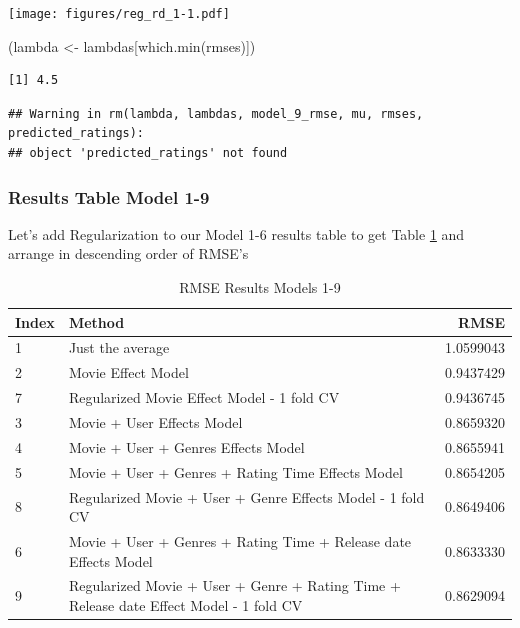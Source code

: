 \documentclass[
]{article}
\newenvironment{Shaded}{}{}
\newcommand{\FunctionTok}[1]{\textcolor[rgb]{0.02,0.16,0.49}{#1}}
\newcommand{\NormalTok}[1]{#1}
\newcommand{\OtherTok}[1]{\textcolor[rgb]{0.00,0.44,0.13}{#1}}
\newcommand{\SpecialCharTok}[1]{\textcolor[rgb]{0.25,0.44,0.63}{#1}}
\begin{document}
\begin{Shaded}
\end{Shaded}

\texttt{[image: figures/reg\_rd\_1-1.pdf]}

\begin{Shaded}
\begin{Highlighting}[]
\NormalTok{(lambda }\OtherTok{\textless{}{-}}\NormalTok{ lambdas[}\FunctionTok{which.min}\NormalTok{(rmses)])}
\end{Highlighting}
\end{Shaded}

\begin{verbatim}
[1] 4.5
\end{verbatim}

\begin{verbatim}
## Warning in rm(lambda, lambdas, model_9_rmse, mu, rmses, predicted_ratings):
## object 'predicted_ratings' not found
\end{verbatim}

\newpage

\hypertarget{results-table-model-1-9}{%
\subsubsection{Results Table Model 1-9}\label{results-table-model-1-9}}

Let's add Regularization to our Model 1-6 results table to get Table
\ref{tbl:rmse_results_model_1-9} and arrange in descending order of
RMSE's

\begin{table}[H]

\caption{\label{tab:reg_rd_3}RMSE Results Models 1-9\label{tbl:rmse_results_model_1-9}}
\centering
\fontsize{7}{9}\selectfont
\begin{tabular}[t]{llr}
\toprule
Index & Method & RMSE\\
\midrule
1 & Just the average & 1.0599043\\
2 & Movie Effect Model & 0.9437429\\
7 & Regularized Movie Effect Model - 1 fold CV & 0.9436745\\
3 & Movie + User Effects Model & 0.8659320\\
4 & Movie + User + Genres Effects Model & 0.8655941\\
5 & Movie + User + Genres + Rating Time Effects Model & 0.8654205\\
8 & Regularized Movie + User + Genre Effects Model - 1 fold CV & 0.8649406\\
6 & Movie + User + Genres + Rating Time + Release date Effects Model & 0.8633330\\
9 & Regularized Movie + User + Genre + Rating Time + Release date Effect Model - 1 fold CV & 0.8629094\\
\bottomrule
\end{tabular}
\end{table}
\newpage
\end{document}
